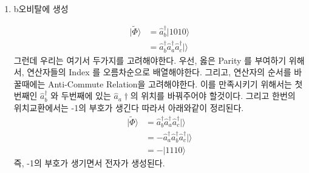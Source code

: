 \documentclass[10pt]{article}
\begin{document}
\begin{enumerate}[label=\(\mathrm{i}\))]
\item {b오비탈에 생성}

\begin{align*}
| \tilde{\Phi }\rangle & = \hat{a}_b^{\dagger}\vert 1010 \rangle \\
& = \hat{a}_b^{\dagger}\hat{a}_a^{\dagger}\hat{a}_c^{\dagger} \vert \rangle 
\end{align*}
그런데 우리는 여기서 두가지를 고려해야한다. 우선, 옳은 Parity 를 부여하기 위해서, 연산자들의 Index 를 오름차순으로 배열해야한다. 
그리고, 연산자의 순서를 바꿀때에는 Anti-Commute Relation을 고려해야한다. 
이를 만족시키기 위해서는 첫번째인 \(\hat{a}_b^{\dagger}\) 와 두번째에 있는 \(\hat{a}_a{\dagger}\)의 위치를 바꿔주어야 할것이다. 
그리고 한번의 위치교환에서는 -1의 부호가 생긴다 따라서 아래와같이 정리된다. 
\begin{align*}
| \tilde{\Phi }\rangle & = \hat{a}_b^{\dagger}\hat{a}_a^{\dagger}\hat{a}_c^{\dagger} \vert \rangle  \\
& = -\hat{a}_a^{\dagger}\hat{a}_b^{\dagger}\hat{a}_c^{\dagger} \vert \rangle \\
& = -\vert 1110 \rangle
\end{align*}
즉, -1의 부호가 생기면서 전자가 생성된다. 

\end{enumerate}
\end{document}
